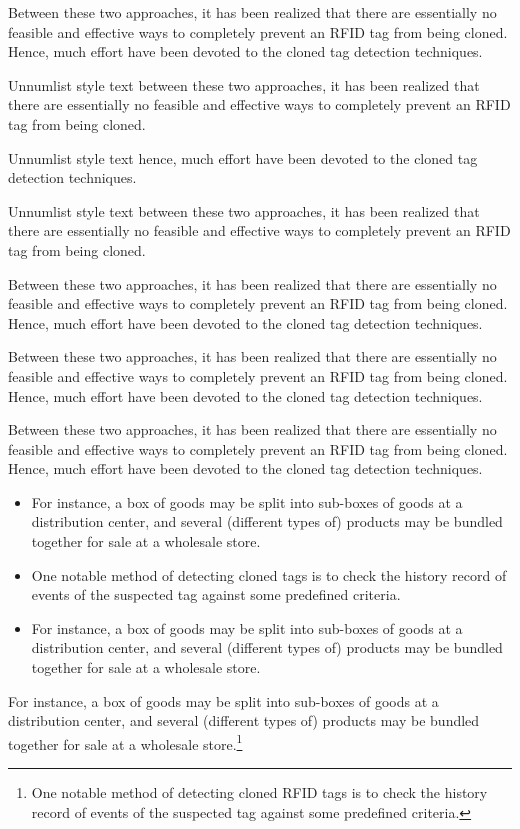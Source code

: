 \documentclass[10pt]{ietbook}
\begin{document}
Between these two approaches, it has been realized that there are essentially no feasible and
effective ways to completely prevent an RFID tag from being cloned.
Hence, much effort have been devoted to the cloned tag detection techniques. 
\begin{unnumlist}
\item{} Unnumlist style text between these two approaches, it has been realized that there are essentially no feasible and effective ways to completely prevent an RFID tag from being cloned. 
\item{} Unnumlist style text hence, much effort have been devoted to the cloned tag detection techniques.
\item{} Unnumlist style text between these two approaches, it has been realized that there are essentially no feasible and effective ways to completely prevent an RFID tag from being cloned. 
\end{unnumlist}
Between these two approaches, it has been realized that there are essentially no feasible and
effective ways to completely prevent an RFID tag from being cloned.
Hence, much effort have been devoted to the cloned tag detection techniques.

Between these two approaches, it has been realized that there are essentially no feasible and
effective ways to completely prevent an RFID tag from being cloned.
Hence, much effort have been devoted to the cloned tag detection techniques.

Between these two approaches, it has been realized that there are essentially no feasible and
effective ways to completely prevent an RFID tag from being cloned.
Hence, much effort have been devoted to the cloned tag detection techniques.
\begin{itemize}
\item{} For instance, a box of goods may be split into sub-boxes of goods at a distribution center, and several (different types of) products may be bundled together for sale at a wholesale store.
\item{} One notable method of detecting cloned tags is to check the history record of events of the suspected tag against some predefined criteria.
\item{} For instance, a box of goods may be split into sub-boxes of goods at a distribution center, and several (different types of) products may be bundled together for sale at a wholesale store.
\end{itemize}
For instance, a box of goods may be split into sub-boxes of goods at a distribution center, and several (different types of) products may be bundled together for sale at a wholesale store.\footnote{One notable method of detecting cloned RFID tags is to check the history record of events of the suspected tag against some predefined criteria.}
\end{document}
